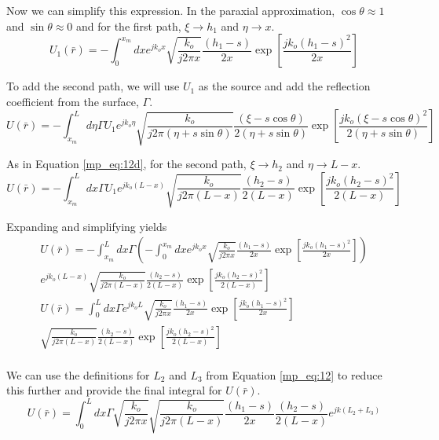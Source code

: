 Now we can simplify this expression. In the paraxial approximation, $\cos\theta \approx 1$ and $\sin\theta \approx 0$ and for the first path, $\xi \rightarrow h_1$ and $\eta\rightarrow x$.
\begin{equation}
U_1(\bar{r}) =  -\int_{0} ^{x_m} dx e^{jk_ox} \sqrt{\frac{k_o}{j2\pi x}}\frac{(h_1-s)}{2x}\exp\left[\frac{jk_o(h_1-s)^2}{2x}\right]
\label{mp_eq:12d}
\end{equation}

To add the second path, we will use $U_1$ as the source and add the reflection coefficient from the surface, $\Gamma$.
\begin{equation}
U(\bar{r}) =  -\int_{x_m}^L d\eta \Gamma U_1e^{jk_o\eta} \sqrt{\frac{k_o}{j2\pi(\eta+s\sin\theta)}}\frac{(\xi-s\cos\theta)}{2(\eta+s\sin\theta)}\exp\left[\frac{jk_o(\xi-s\cos\theta)^2}{2(\eta+s\sin\theta)}\right]
\label{mp_eq:12e}
\end{equation}

As in Equation \ref{mp_eq:12d}, for the second path, $\xi \rightarrow h_2$ and $\eta\rightarrow L-x$.
\begin{equation}
U(\bar{r}) =  -\int_{x_m}^L dx \Gamma U_1 e^{jk_o(L-x)}\sqrt{\frac{k_o}{j2\pi(L-x)}}\frac{(h_2-s)}{2(L-x)}\exp\left[\frac{jk_o(h_2-s)^2}{2(L-x)}\right]
\label{mp_eq:12e}
\end{equation}

Expanding and simplifying yields
\begin{equation}
\begin{gathered}
U(\bar{r}) =  -\int_{x_m}^L dx \Gamma\left(-\int_{0} ^{x_m} dx e^{jk_ox} \sqrt{\frac{k_o}{j2\pi x}}\frac{(h_1-s)}{2x}\exp\left[\frac{jk_o(h_1-s)^2}{2x}\right]\right)  \\e^{jk_o(L-x)}\sqrt{\frac{k_o}{j2\pi(L-x)}}\frac{(h_2-s)}{2(L-x)}\exp\left[\frac{jk_o(h_2-s)^2}{2(L-x)}\right]\\
U(\bar{r}) =  \int_{0}^L dx \Gamma e^{jk_oL} \sqrt{\frac{k_o}{j2\pi x}}\frac{(h_1-s)}{2x}\exp\left[\frac{jk_o(h_1-s)^2}{2x}\right]  \\\sqrt{\frac{k_o}{j2\pi(L-x)}}\frac{(h_2-s)}{2(L-x)}\exp\left[\frac{jk_o(h_2-s)^2}{2(L-x)}\right]\\
\end{gathered}
\label{mp_eq:12f}
\end{equation}

We can use the definitions for $L_2$ and $L_3$ from Equation \ref{mp_eq:12} to reduce this further and provide the final integral for $U(\bar{r})$.
\begin{equation}
\boxed{U(\bar{r}) =  \int_{0}^L dx \Gamma \sqrt{\frac{k_o}{j2\pi x}}\sqrt{\frac{k_o}{j2\pi(L-x)}}\frac{(h_1-s)}{2x}\frac{(h_2-s)}{2(L-x)}e^{jk(L_2+L_3)}}
\label{mp_eq:12g}
\end{equation}

